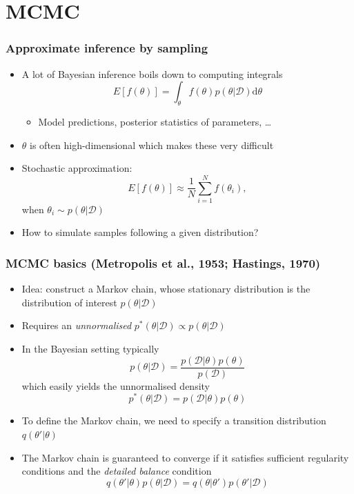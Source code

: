 \documentclass{beamer}
\newcommand{\dataset}{\mathcal{D}}
\newcommand{\parameters}{\theta}
\newcommand{\diff}{\mathrm{d}}
\begin{document}


\section{MCMC}


\begin{frame}
  \frametitle{Approximate inference by sampling}

  \begin{itemize}
  \item A lot of Bayesian inference boils down to computing integrals
    $$ E[f(\parameters)] = \int_\parameters f(\parameters) p(\parameters | \dataset) \diff\parameters $$
    \begin{itemize}
    \item Model predictions, posterior statistics of parameters, \dots
    \end{itemize}
  \item $\parameters$ is often high-dimensional which makes these very difficult
  \item Stochastic approximation:
    $$ E[f(\parameters)] \approx \frac{1}{N} \sum_{i=1}^N f(\parameters_i), $$
    when $\parameters_i \sim p(\parameters | \dataset)$
  \item How to simulate samples following a given distribution?
  \end{itemize}
\end{frame}

\begin{frame}
  \frametitle{MCMC basics (Metropolis et al., 1953; Hastings, 1970)}

  \begin{itemize}
  \item Idea: construct a Markov chain, whose stationary distribution
    is the distribution of interest $p(\parameters | \dataset)$
  \item Requires an \emph{unnormalised} $p^*(\parameters | \dataset) \propto
    p(\parameters | \dataset)$
  \item In the Bayesian setting typically
    $$ p(\parameters | \dataset) = \frac{p(\dataset | \parameters) p(\parameters)}{p(\dataset)} $$
    which easily yields the unnormalised density
    $$ p^*(\parameters | \dataset) = p(\dataset | \parameters) p(\parameters) $$
  \item To define the Markov chain, we need to specify a transition
    distribution $q(\parameters' | \parameters)$
  \item The Markov chain is guaranteed to converge if it satisfies
    sufficient regularity conditions and the \emph{detailed balance}
    condition
    $$ q(\parameters' | \parameters) p(\parameters | \dataset) =
       q(\parameters | \parameters') p(\parameters' | \dataset) $$
  \end{itemize}
\end{frame}
\end{document}
